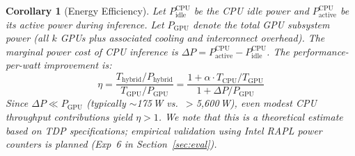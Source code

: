 \documentclass[10pt,conference]{IEEEtran}
\newtheorem{corollary}[theorem]{Corollary}
\begin{document}
\begin{corollary}[Energy Efficiency]
\label{cor:energy}
Let $P_\text{idle}^\text{CPU}$ be the CPU idle power and $P_\text{active}^\text{CPU}$ be its active power during inference. Let $P_\text{GPU}$ denote the total GPU subsystem power (all $k$ GPUs plus associated cooling and interconnect overhead). The marginal power cost of CPU inference is $\Delta P = P_\text{active}^\text{CPU} - P_\text{idle}^\text{CPU}$. The performance-per-watt improvement is:
\begin{equation}
\label{eq:energy}
\eta = \frac{T_\text{hybrid} / P_\text{hybrid}}{T_\text{GPU} / P_\text{GPU}} = \frac{1 + \alpha \cdot T_\text{CPU}/T_\text{GPU}}{1 + \Delta P / P_\text{GPU}}
\end{equation}
Since $\Delta P \ll P_\text{GPU}$ (typically $\sim$175\,W vs.\ $>$5,600\,W), even modest CPU throughput contributions yield $\eta > 1$.
We note that this is a \emph{theoretical estimate} based on TDP specifications; empirical validation using Intel RAPL power counters is planned (Exp~6 in Section~\ref{sec:eval}).
\end{corollary}
\end{document}
